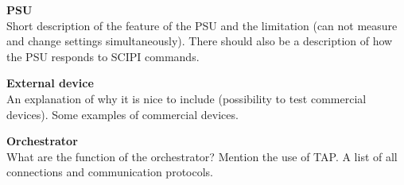 \textbf{PSU}\\
Short description of the feature of the PSU and the limitation (can not measure and change settings simultaneously). There should also be a description of how the PSU responds to SCIPI commands.

\textbf{External device}\\
An explanation of why it is nice to include (possibility to test commercial devices). Some examples of commercial devices. 

\textbf{Orchestrator}\\
What are the function of the orchestrator? Mention the use of TAP. A list of all connections and communication protocols. 



%
%
%
%
%
%
%
